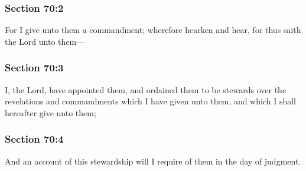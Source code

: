 	\subsubsection{Section 70:2} %
		\label{DC70-2}

		For I give unto them a commandment; wherefore hearken and hear, for thus saith the Lord unto them---


	\subsubsection{Section 70:3} %
		\label{DC70-3}

		I, the Lord, have appointed them, and ordained them to be stewards over the revelations and commandments which I have given unto them, and which I shall hereafter give unto them;


	\subsubsection{Section 70:4} %
		\label{DC70-4}

		And an account of this stewardship will I require of them in the day of judgment.


